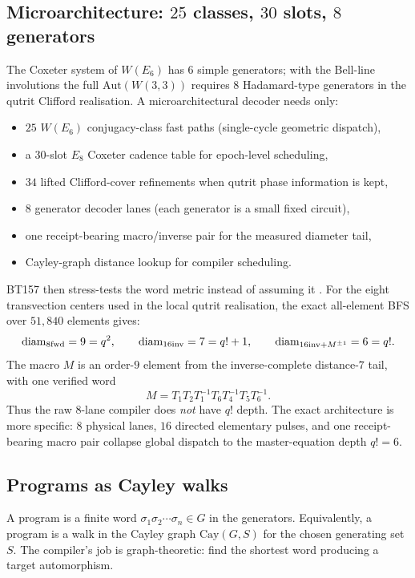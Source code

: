 \documentclass[11pt,letterpaper]{article}
\theoremstyle{remark}
\newcommand{\W}{W(3,3)}
\newcommand{\Aut}{\mathrm{Aut}}
\begin{document}
\subsection{\texorpdfstring{Microarchitecture: $25$ classes, $30$ slots, $8$ generators}{Microarchitecture: 25 classes, 30 slots, 8 generators}}

The Coxeter system of $W(E_6)$ has $6$ simple generators; with the Bell-line involutions
the full $\Aut(\W)$ requires $8$ Hadamard-type generators in the qutrit Clifford
realisation. A microarchitectural decoder needs only:
\begin{itemize}[leftmargin=2em,nosep]
\item $25$ $W(E_6)$ conjugacy-class fast paths (single-cycle geometric dispatch),
\item a $30$-slot $E_8$ Coxeter cadence table for epoch-level scheduling,
\item $34$ lifted Clifford-cover refinements when qutrit phase information is kept,
\item $8$ generator decoder lanes (each generator is a small fixed circuit),
\item one receipt-bearing macro/inverse pair for the measured diameter tail,
\item Cayley-graph distance lookup for compiler scheduling.
\end{itemize}

BT157 then stress-tests the word metric instead of assuming it \cite{wrf-bt157}. For the
eight transvection centers used in the local qutrit realisation, the exact all-element BFS
over $51{,}840$ elements gives:
\[
\operatorname{diam}_{8{\rm fwd}}=9=q^2,\qquad
\operatorname{diam}_{16{\rm inv}}=7=q!+1,\qquad
\operatorname{diam}_{16{\rm inv}+M^{\pm1}}=6=q!.
\]
The macro $M$ is an order-$9$ element from the inverse-complete distance-$7$ tail, with
one verified word
\[
M=T_1T_2T_1^{-1}T_6T_4^{-1}T_5T_6^{-1}.
\]
Thus the raw $8$-lane compiler does \emph{not} have $q!$ depth. The exact architecture is
more specific: $8$ physical lanes, $16$ directed elementary pulses, and one
receipt-bearing macro pair collapse global dispatch to the master-equation depth $q!=6$.

\subsection{Programs as Cayley walks}

A program is a finite word $\sigma_1 \sigma_2 \cdots \sigma_n \in G$ in the generators.
Equivalently, a program is a walk in the Cayley graph $\mathrm{Cay}(G, S)$ for the chosen
generating set $S$. The compiler's job is graph-theoretic: find the shortest word
producing a target automorphism.
\end{document}
